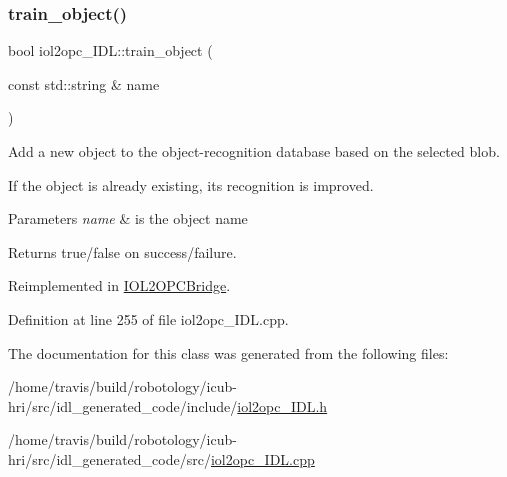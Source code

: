 \subsubsection{\texorpdfstring{train\+\_\+object()}{train\_object()}}
{\footnotesize\ttfamily bool iol2opc\+\_\+\+I\+D\+L\+::train\+\_\+object (\begin{DoxyParamCaption}\item[{const std\+::string \&}]{name }\end{DoxyParamCaption})\hspace{0.3cm}{\ttfamily [virtual]}}



Add a new object to the object-\/recognition database based on the selected blob. 

If the object is already existing, its recognition is improved. 
\begin{DoxyParams}{Parameters}
{\em name} & is the object name \\
\hline
\end{DoxyParams}
\begin{DoxyReturn}{Returns}
true/false on success/failure. 
\end{DoxyReturn}


Reimplemented in \hyperlink{group__iol2opc_aa48eed5c7920cd2116c81e88cae0ab4a}{I\+O\+L2\+O\+P\+C\+Bridge}.



Definition at line 255 of file iol2opc\+\_\+\+I\+D\+L.\+cpp.



The documentation for this class was generated from the following files\+:\begin{DoxyCompactItemize}
\item 
/home/travis/build/robotology/icub-\/hri/src/idl\+\_\+generated\+\_\+code/include/\hyperlink{iol2opc__IDL_8h}{iol2opc\+\_\+\+I\+D\+L.\+h}\item 
/home/travis/build/robotology/icub-\/hri/src/idl\+\_\+generated\+\_\+code/src/\hyperlink{iol2opc__IDL_8cpp}{iol2opc\+\_\+\+I\+D\+L.\+cpp}\end{DoxyCompactItemize}
